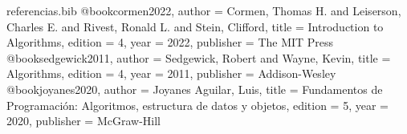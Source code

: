 \begin{filecontents*}{referencias.bib}
@book{cormen2022,
  author    = {Cormen, Thomas H. and Leiserson, Charles E. and Rivest, Ronald L. and Stein, Clifford},
  title     = {Introduction to Algorithms},
  edition   = {4},
  year      = {2022},
  publisher = {The MIT Press}
}
@book{sedgewick2011,
  author    = {Sedgewick, Robert and Wayne, Kevin},
  title     = {Algorithms},
  edition   = {4},
  year      = {2011},
  publisher = {Addison-Wesley}
}
@book{joyanes2020,
  author    = {Joyanes Aguilar, Luis},
  title     = {Fundamentos de Programaci{\'o}n: Algoritmos, estructura de datos y objetos},
  edition   = {5},
  year      = {2020},
  publisher = {McGraw-Hill}
}
\end{filecontents*}

\documentclass[12pt,a4paper,twocolumn]{article}

\usepackage[utf8]{inputenc}
\usepackage[T1]{fontenc}
\usepackage[spanish,english]{babel}
\usepackage{newtxtext,newtxmath}
\usepackage[a4paper,margin=2.5cm]{geometry}
\usepackage{setspace}
\usepackage{indentfirst}
\usepackage{csquotes}
\usepackage{booktabs}
\usepackage{graphicx} %
\usepackage{microtype}
\usepackage{hyperref}
\usepackage{titlesec}
\usepackage[style=apa,backend=biber,sortcites=true]{biblatex}


\setlength{\parindent}{1.27cm}
\setlength{\parskip}{0pt}
\setlength{\columnsep}{0.7cm}
\hypersetup{colorlinks=true,allcolors=black}

\titleformat{\section}
  {\normalfont\bfseries\fontsize{12}{14}\selectfont}
  {\thesection.}{0.5em}{}
\titleformat{\subsection}
  {\normalfont\bfseries\fontsize{12}{14}\selectfont}
  {\thesubsection}{0.5em}{}


\onecolumn

